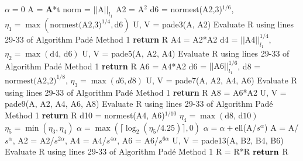 \begin{algorithm}
	\caption{Pad\'e Method 2} 
	\begin{algorithmic}[1]
		\State $\alpha = 0$ 
		\State A = $\boldsymbol{A}$*t 
		\State norm = $||\text{A}||_{l_{1}}$ 
		\State A2 = A$^{2}$ 
		\State d6 = normest(A2,3)$^{1/6}$,  $\eta_{1} = \max(\text{normest(A2,3)}^{1/4}, \text{d6})$
         
            \State U, V = pade3(A, A2)
            \State Evaluate R using lines 29-33 of Algorithm Pad\'e Method 1
            \State \textbf{return} R
        \EndIf
        \State A4 = A2*A2
        \State d4 = $||\text{A4}||_{l_{1}}^{1/4}$, $\eta_{2} = \max(\text{d4, d6})$
         
            \State U, V = pade5(A, A2, A4)
            \State Evaluate R using lines 29-33 of Algorithm Pad\'e Method 1
            \State \textbf{return} R
        \EndIf
        \State A6 = A4*A2
        \State d6 = $||\text{A6}||_{l_{1}}^{1/6}$, d8 = $\text{normest(A2,2)}^{1/8}$, $\eta_{3} = \max(d6,d8)$
         
            \State U, V = pade7(A, A2, A4, A6)
            \State Evaluate R using lines 29-33 of Algorithm Pad\'e Method 1
            \State \textbf{return} R
        \EndIf 
         
            \State A8 = A6*A2
            \State U, V = pade9(A, A2, A4, A6, A8)
            \State Evaluate R using lines 29-33 of Algorithm Pad\'e Method 1
            \State \textbf{return} R
        \EndIf 
        \State d10 = normest(A4, A6)$^{1/10}$
        \State $\eta_{4} = \max(\text{d8, d10})$
        \State $\eta_{5} = \min(\eta_{3}, \eta_{4})$
        \State $\alpha = \max(\lceil \log_{2}(\eta_{5}/4.25)\rceil, 0)$
        \State $\alpha = \alpha + $ell(A/$s^{\alpha}$) 
        \State A = A/$s^{\alpha}$, A2 = A2/$s^{2\alpha}$, A4 = A4/$s^{4\alpha}$, A6 = A6/$s^{6\alpha}$
        \State U, V = pade13(A, B2, B4, B6) 
        \State Evaluate R using lines 29-33 of Algorithm Pad\'e Method 1
         
            \State R = R*R
        \EndFor
        \State ${\text{\textbf{return}}}$ R
		\EndProcedure
	\end{algorithmic} 
	\label{alg:method2}
\end{algorithm}

